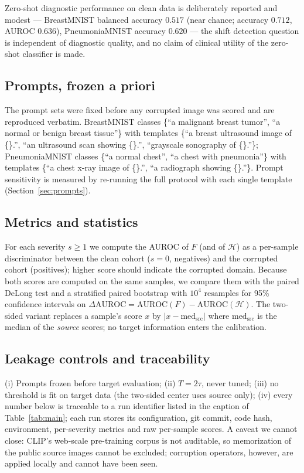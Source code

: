 \documentclass[11pt]{article}
\newcommand{\Hent}{\mathcal{H}}
\begin{document}
Zero-shot diagnostic performance on clean data is deliberately reported and
modest --- BreastMNIST balanced accuracy $0.517$ (near chance; accuracy
$0.712$, AUROC $0.636$), PneumoniaMNIST accuracy $0.620$ --- the shift
detection question is independent of diagnostic quality, and no claim of
clinical utility of the zero-shot classifier is made.

\subsection{Prompts, frozen a priori}

The prompt sets were fixed before any corrupted image was scored and are
reproduced verbatim. BreastMNIST classes \{``a malignant breast tumor'',
``a normal or benign breast tissue''\} with templates
\{``a breast ultrasound image of \{\}.'', ``an ultrasound scan showing \{\}.'',
``grayscale sonography of \{\}.''\};
PneumoniaMNIST classes \{``a normal chest'', ``a chest with pneumonia''\}
with templates \{``a chest x-ray image of \{\}.'',
``a radiograph showing \{\}.''\}. Prompt sensitivity is measured by re-running
the full protocol with each single template (Section~\ref{sec:prompts}).

\subsection{Metrics and statistics}

For each severity $s\ge1$ we compute the AUROC of $F$ (and of $\Hent$) as a
per-sample discriminator between the clean cohort ($s=0$, negatives) and the
corrupted cohort (positives); higher score should indicate the corrupted
domain. Because both scores are computed on the same samples, we compare them
with the paired DeLong test \citep{delong1988} and a stratified paired
bootstrap \citep{efron1994bootstrap} with $10^4$ resamples for 95\%
confidence intervals on $\Delta\mathrm{AUROC} = \mathrm{AUROC}(F) -
\mathrm{AUROC}(\Hent)$. The two-sided variant replaces a sample's score $x$ by
$|x - \mathrm{med}_{\mathrm{src}}|$ where $\mathrm{med}_{\mathrm{src}}$ is the
median of the \emph{source} scores; no target information enters the
calibration.

\subsection{Leakage controls and traceability}

(i) Prompts frozen before target evaluation; (ii) $T=2\tau$, never tuned;
(iii) no threshold is fit on target data (the two-sided center uses source
only); (iv) every number below is traceable to a run identifier listed in the
caption of Table~\ref{tab:main}; each run stores its
configuration, git commit, code hash, environment, per-severity metrics and
raw per-sample scores. A caveat we cannot close: CLIP's web-scale pre-training
corpus is not auditable, so memorization of the public source images cannot be
excluded; corruption operators, however, are applied locally and cannot have
been seen.
\end{document}
